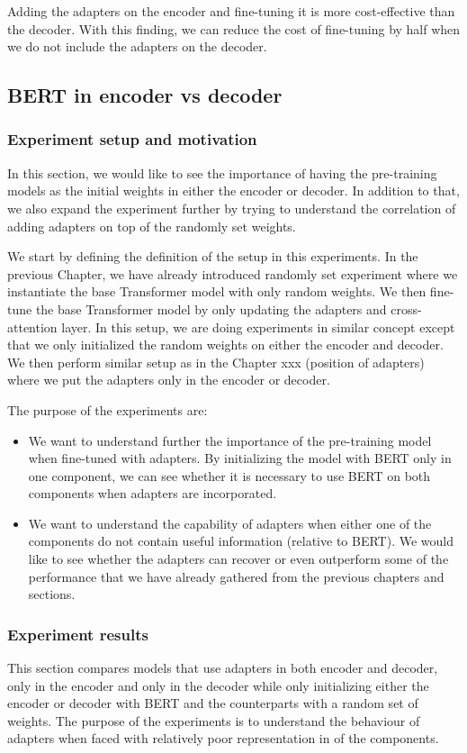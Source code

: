 Adding the adapters on the encoder and fine-tuning it is more cost-effective than the decoder. With this finding, we can reduce the cost of fine-tuning by half when we do not include the adapters on the decoder.

\subsection{BERT in encoder vs decoder}
\label{sec:pospre}
\subsubsection{Experiment setup and motivation}
In this section, we would like to see the importance of having the pre-training models as the initial weights in either the encoder or decoder. In addition to that, we also expand the experiment further by trying to understand the correlation of adding adapters on top of the randomly set weights.

We start by defining the definition of the setup in this experiments. In the previous Chapter, we have already introduced randomly set experiment where we instantiate the base Transformer model with only random weights. We then fine-tune the base Transformer model by only updating the adapters and cross-attention layer. In this setup, we are doing experiments in similar concept except that we only initialized the random weights on either the encoder and decoder. We then perform similar setup as in the Chapter xxx (position of adapters) where we put the adapters only in the encoder or decoder.

The purpose of the experiments are:
\begin{itemize}
    \item We want to understand further the importance of the pre-training model when fine-tuned with adapters. By initializing the model with BERT only in one component, we can see whether it is necessary to use BERT on both components when adapters are incorporated.
    \item We want to understand the capability of adapters when either one of the components do not contain useful information (relative to BERT). We would like to see whether the adapters can recover or even outperform some of the performance that we have already gathered from the previous chapters and sections.
\end{itemize}

\subsubsection{Experiment results}
This section compares models that use adapters in both encoder and decoder, only in the encoder and only in the decoder while only initializing either the encoder or decoder with BERT and the counterparts with a random set of weights. The purpose of the experiments is to understand the behaviour of adapters when faced with relatively poor representation in of the components.

